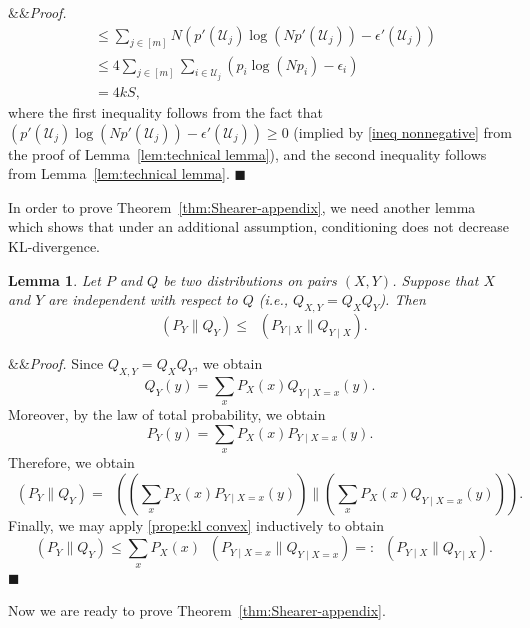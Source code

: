 \documentclass[11pt]{article}
\renewenvironment{proof}[1][]
    {\noindent
       \ifx&#1&{\it Proof.}
       \else{\it Proof ({#1}).}
       \fi}{\hfill $\blacksquare$}
\newtheorem{lemma}[theorem]{Lemma}
\DeclareMathOperator{\KL}{D_{\text{KL}}}
\begin{document}
\begin{proof}
\begin{align*}
    & \le \sum_{j \in [m]}N\left(p'(\mathcal{U}_j)\log\left(Np'(\mathcal{U}_j)\right) - \epsilon'(\mathcal{U}_j)\right)\\
    & \le 4\sum_{j \in [m]}\sum_{i \in \mathcal{U}_j}\left(p_{i}\log(Np_{i})-\epsilon_{i}\right)\\
    & = 4kS,
\end{align*}
where the first inequality follows from the fact that $\left(p'(\mathcal{U}_j)\log\left(Np'(\mathcal{U}_j)\right) - \epsilon'(\mathcal{U}_j)\right) \ge 0$ (implied by \ref{ineq nonnegative} from the proof of Lemma~\ref{lem:technical lemma}), and the second inequality follows from Lemma~\ref{lem:technical lemma}.
\end{proof}

In order to prove Theorem~\ref{thm:Shearer-appendix}, we need another lemma which shows that under an additional assumption, conditioning does not decrease KL-divergence.

\begin{lemma}\label{lem:conditinal KL bound}
Let $P$ and $Q$ be two distributions on pairs $(X,Y)$. Suppose that $X$ and $Y$ are independent with respect to $Q$ (i.e., $Q_{X,Y} = Q_X Q_Y$). Then
\[
    \KL( P_{Y} \| Q_{Y}) \le \KL( P_{Y \mid X} \| Q_{Y \mid X} ).
\]
\end{lemma}
\begin{proof}
Since $Q_{X,Y} = Q_X Q_Y$, we obtain
\[
    Q_Y(y) = \sum_x P_X(x)Q_{Y\mid X=x}(y).
\]
Moreover, by the law of total probability, we obtain
\[
    P_Y(y) = \sum_x P_X(x)P_{Y\mid X=x}(y).
\]
Therefore, we obtain
\[
    \KL( P_{Y} \| Q_{Y}) = \KL\left(\left(\sum_x P_X(x)P_{Y\mid X=x}(y)\right) \| \left(\sum_x P_X(x)Q_{Y\mid X=x}(y)\right)\right).
\]
Finally, we may apply \ref{prope:kl convex} inductively to obtain
\[
    \KL( P_{Y} \| Q_{Y}) \le \sum_x P_X(x)\KL(P_{Y\mid X=x} \| Q_{Y\mid X=x}) =: \KL( P_{Y \mid X} \| Q_{Y \mid X} ).
\]
\end{proof}

\medskip \noindent Now we are ready to prove Theorem~\ref{thm:Shearer-appendix}.

\medskip 
\end{document}
